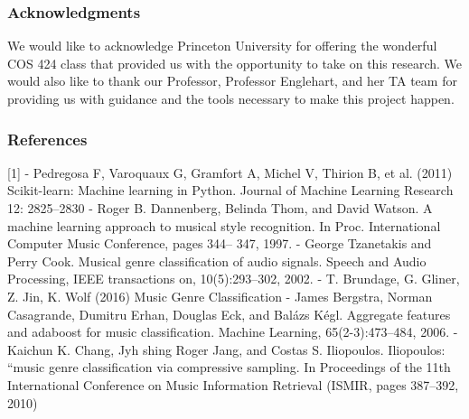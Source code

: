 \documentclass{article} %
\begin{document}
\subsubsection*{Acknowledgments}
We would like to acknowledge Princeton University for offering the wonderful COS 424 class that provided us with the opportunity to take on this research. We would also like to thank our Professor, Professor Englehart, and her TA team for providing us with guidance and the tools necessary to make this project happen.


\subsubsection*{References}
[1] - Pedregosa F, Varoquaux G, Gramfort A, Michel V, Thirion B, et al. (2011) Scikit-learn: Machine
learning in Python. Journal of Machine Learning Research 12: 2825–2830
\newline
\newline
[2] - Roger B. Dannenberg, Belinda Thom, and David Watson. A machine learning approach to
musical style recognition. In Proc. International Computer Music Conference, pages 344–
347, 1997.
\newline
\newline
[3] - George Tzanetakis and Perry Cook. Musical genre classification of audio signals. Speech and
Audio Processing, IEEE transactions on, 10(5):293–302, 2002.
\newline
\newline
[4] - T. Brundage, G. Gliner, Z. Jin, K. Wolf  (2016) Music Genre Classification 
\newline
\newline
[5] - James Bergstra, Norman Casagrande, Dumitru Erhan, Douglas Eck, and Balázs Kégl. Aggregate
features and adaboost for music classification. Machine Learning, 65(2-3):473–484,
2006.
\newline
\newline
[6] - Kaichun K. Chang, Jyh shing Roger Jang, and Costas S. Iliopoulos. Iliopoulos: “music genre
classification via compressive sampling. In Proceedings of the 11th International Conference
on Music Information Retrieval (ISMIR, pages 387–392, 2010)
\end{document}
